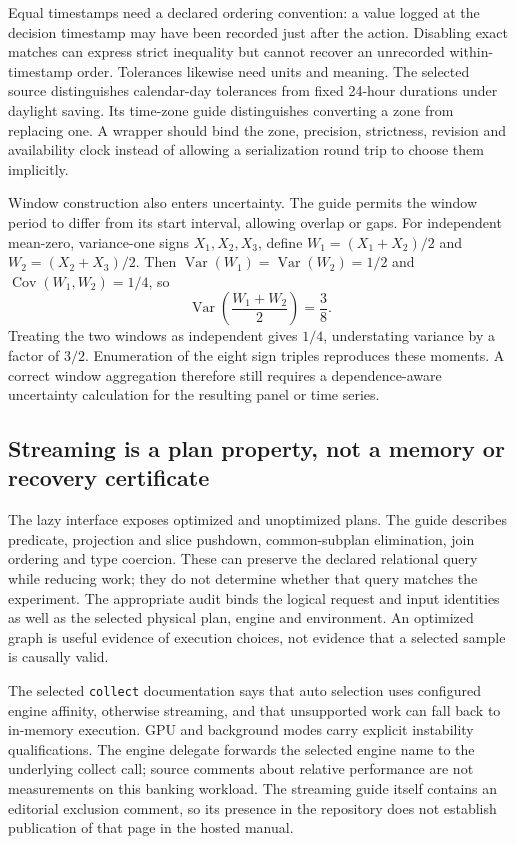 Equal timestamps need a declared ordering convention: a value logged at
the decision timestamp may have been recorded just after the action.
Disabling exact matches can express strict inequality but cannot recover
an unrecorded within-timestamp order. Tolerances likewise need units and
meaning. The selected source distinguishes calendar-day tolerances from
fixed 24-hour durations under daylight saving. Its time-zone guide
distinguishes converting a zone from replacing one. A wrapper should bind
the zone, precision, strictness, revision and availability clock instead
of allowing a serialization round trip to choose them implicitly.
\citep{exec23_polars_sources}

Window construction also enters uncertainty. The guide permits the
window period to differ from its start interval, allowing overlap or
gaps. For independent mean-zero, variance-one signs $X_1,X_2,X_3$, define
$W_1=(X_1+X_2)/2$ and $W_2=(X_2+X_3)/2$. Then
$\operatorname{Var}(W_1)=\operatorname{Var}(W_2)=1/2$ and
$\operatorname{Cov}(W_1,W_2)=1/4$, so
\begin{equation}
 \operatorname{Var}\!\left(\frac{W_1+W_2}{2}\right)=\frac{3}{8}.
 \label{eq:exec23-polars-overlap}
\end{equation}
Treating the two windows as independent gives $1/4$, understating variance
by a factor of $3/2$. Enumeration of the eight sign triples reproduces
these moments. A correct window aggregation therefore still requires a
dependence-aware uncertainty calculation for the resulting panel or time
series.\citep{exec23_polars_sources,exec23_polars_reference}

\subsection{Streaming is a plan property, not a memory or recovery certificate}

The lazy interface exposes optimized and unoptimized plans. The guide
describes predicate, projection and slice pushdown, common-subplan
elimination, join ordering and type coercion. These can preserve the
declared relational query while reducing work; they do not determine
whether that query matches the experiment. The appropriate audit binds
the logical request and input identities as well as the selected physical
plan, engine and environment. An optimized graph is useful evidence of
execution choices, not evidence that a selected sample is causally valid.
\citep{exec23_polars_sources}

The selected \texttt{collect} documentation says that auto selection uses
configured engine affinity, otherwise streaming, and that unsupported
work can fall back to in-memory execution. GPU and background modes carry
explicit instability qualifications. The engine delegate forwards the
selected engine name to the underlying collect call; source comments
about relative performance are not measurements on this banking workload.
The streaming guide itself contains an editorial exclusion comment, so
its presence in the repository does not establish publication of that
page in the hosted manual.\citep{exec23_polars_sources}

